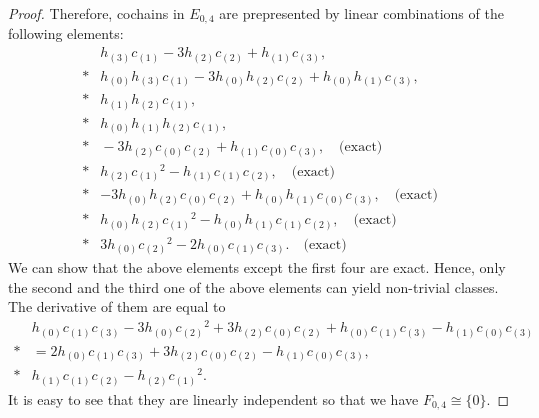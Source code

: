 \documentclass[10pt,a4paper]{amsart}
\begin{document}
\begin{proof}
Therefore, cochains in $E_{0,4}$ are prepresented by linear combinations of the following elements:
\begin{align*}
&h_{(3)}c_{(1)}-3h_{(2)}c_{(2)}+h_{(1)}c_{(3)},\\*
&h_{(0)}h_{(3)}c_{(1)}-3h_{(0)}h_{(2)}c_{(2)}+h_{(0)}h_{(1)}c_{(3)},\\*
&h_{(1)}h_{(2)}c_{(1)},\\*
&h_{(0)}h_{(1)}h_{(2)}c_{(1)},\\*
&{}-3h_{(2)}c_{(0)}c_{(2)}+h_{(1)}c_{(0)}c_{(3)},\quad\text{(exact)}\\*
&h_{(2)}c_{(1)}{}^2-h_{(1)}c_{(1)}c_{(2)},\quad\text{(exact)}\\*
&-3h_{(0)}h_{(2)}c_{(0)}c_{(2)}+h_{(0)}h_{(1)}c_{(0)}c_{(3)},\quad\text{(exact)}\\*
&h_{(0)}h_{(2)}c_{(1)}{}^2-h_{(0)}h_{(1)}c_{(1)}c_{(2)},\quad\text{(exact)}\\*
&3h_{(0)}c_{(2)}{}^2-2h_{(0)}c_{(1)}c_{(3)}.\quad\text{(exact)}
\end{align*}
We can show that the above elements except the first four are exact.
Hence, only the second and the third one of the above elements can yield non-trivial classes.
The derivative of them are equal to
\begin{align*}
&h_{(0)}c_{(1)}c_{(3)}-3h_{(0)}c_{(2)}{}^2+3h_{(2)}c_{(0)}c_{(2)}+h_{(0)}c_{(1)}c_{(3)}-h_{(1)}c_{(0)}c_{(3)}\\*
&=2h_{(0)}c_{(1)}c_{(3)}+3h_{(2)}c_{(0)}c_{(2)}-h_{(1)}c_{(0)}c_{(3)},\\*
&h_{(1)}c_{(1)}c_{(2)}-h_{(2)}c_{(1)}{}^2.
\end{align*}
It is easy to see that they are linearly independent so that we have $F_{0,4}\cong\{0\}$.
\end{proof}
\end{document}
